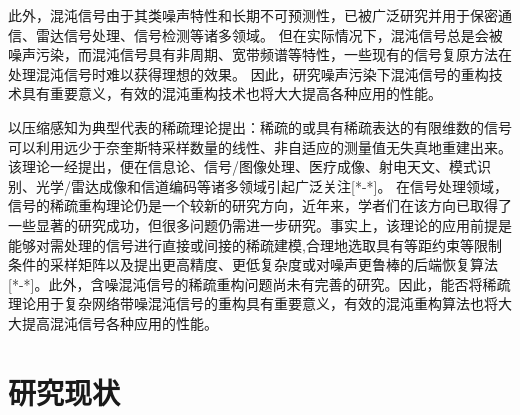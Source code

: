 此外，混沌信号由于其类噪声特性和长期不可预测性，已被广泛研究并用于保密通信、雷达信号处理、信号检测等诸多领域。
但在实际情况下，混沌信号总是会被噪声污染，而混沌信号具有非周期、宽带频谱等特性，一些现有的信号复原方法在处理混沌信号时难以获得理想的效果。
因此，研究噪声污染下混沌信号的重构技术具有重要意义，有效的混沌重构技术也将大大提高各种应用的性能。

以压缩感知为典型代表的稀疏理论提出：稀疏的或具有稀疏表达的有限维数的信号可以利用远少于奈奎斯特采样数量的线性、非自适应的测量值无失真地重建出来。
该理论一经提出，便在信息论、信号/图像处理、医疗成像、射电天文、模式识别、光学/雷达成像和信道编码等诸多领域引起广泛关注[*-*]。
在信号处理领域，信号的稀疏重构理论仍是一个较新的研究方向，近年来，学者们在该方向已取得了一些显著的研究成功，但很多问题仍需进一步研究。事实上，该理论的应用前提是能够对需处理的信号进行直接或间接的稀疏建模,合理地选取具有等距约束等限制条件的采样矩阵以及提出更高精度、更低复杂度或对噪声更鲁棒的后端恢复算法[*-*]。此外，含噪混沌信号的稀疏重构问题尚未有完善的研究。因此，能否将稀疏理论用于复杂网络带噪混沌信号的重构具有重要意义，有效的混沌重构算法也将大大提高混沌信号各种应用的性能。

\section{研究现状}
